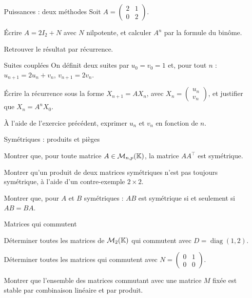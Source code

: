 \begin{exercice}[2]{Puissances : deux méthodes}
Soit $A=\begin{pmatrix}2&1\\0&2\end{pmatrix}$.
\begin{questions}
  \item Écrire $A=2I_2+N$ avec $N$ nilpotente, et calculer $A^{n}$ par la
    formule du binôme.
  \item Retrouver le résultat par récurrence.
\end{questions}
\end{exercice}

\begin{exercice}[2]{Suites couplées}
On définit deux suites par $u_0=v_0=1$ et, pour tout $n$ :
$u_{n+1}=2u_n+v_n$, $v_{n+1}=2v_n$.
\begin{questions}
  \item Écrire la récurrence sous la forme $X_{n+1}=AX_n$, avec
    $X_n=\begin{pmatrix}u_n\\v_n\end{pmatrix}$, et justifier que
    $X_n=A^{n}X_0$.
  \item À l'aide de l'exercice précédent, exprimer $u_n$ et $v_n$ en
    fonction de $n$.
\end{questions}
\end{exercice}

\begin{exercice}[2]{Symétriques : produits et pièges}
\begin{questions}
  \item Montrer que, pour toute matrice $A\in\mathcal{M}_{n,p}(\mathbb{K})$, la
    matrice $AA^{\top}$ est symétrique.
  \item Montrer qu'un produit de deux matrices symétriques n'est pas
    toujours symétrique, à l'aide d'un contre-exemple $2\times2$.
  \item Montrer que, pour $A$ et $B$ symétriques : $AB$ est symétrique si
    et seulement si $AB=BA$.
\end{questions}
\end{exercice}

\begin{exercice}[2]{Matrices qui commutent}
\begin{questions}
  \item Déterminer toutes les matrices de $\mathcal{M}_2(\mathbb{K})$ qui
    commutent avec $D=\operatorname{diag}(1,2)$.
  \item Déterminer toutes les matrices qui commutent avec
    $N=\begin{pmatrix}0&1\\0&0\end{pmatrix}$.
  \item Montrer que l'ensemble des matrices commutant avec une matrice
    $M$ fixée est stable par combinaison linéaire et par produit.
\end{questions}
\end{exercice}

